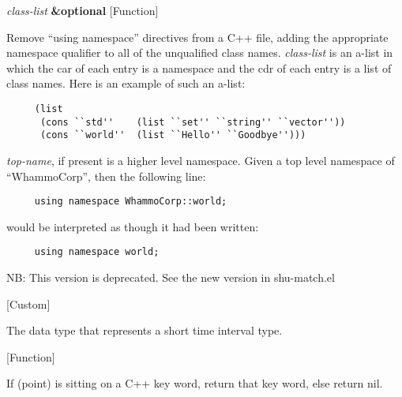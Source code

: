 \vspace{1em}
\noindent
{}
\usebox{\funcname}\emph{class-list} \textbf{\&optional}
 \hfill [Function]
\hspace*{\wd\funcname}

\begin{doc-string}
Remove ``using namespace'' directives from a C++ file, adding the appropriate
namespace qualifier to all of the unqualified class names.  \emph{class-list} is an
a-list in which the car of each entry is a namespace and the cdr of each entry
is a list of class names.  Here is an example of such an a-list:

\small{\begin{verbatim}
     (list
      (cons ``std''    (list ``set'' ``string'' ``vector''))
      (cons ``world''  (list ``Hello'' ``Goodbye'')))
\end{verbatim}}

\emph{top-name}, if present is a higher level namespace.  Given a top level namespace
of ``WhammoCorp'', then the following line:

\small{\begin{verbatim}
     using namespace WhammoCorp::world;
\end{verbatim}}

would be interpreted as though it had been written:

\small{\begin{verbatim}
     using namespace world;
\end{verbatim}}

NB: This version is deprecated.  See the new version in shu-match.el
\end{doc-string}

\vspace{1em}
\noindent
{}
\usebox{\funcname}
 \hfill [Custom]

\begin{doc-string}
The data type that represents a short time interval type.
\end{doc-string}

\vspace{1em}
\noindent
{}
\usebox{\funcname}
 \hfill [Function]

\begin{doc-string}
If (point) is sitting on a C++ key word, return that key word, else return
 nil.
\end{doc-string}

